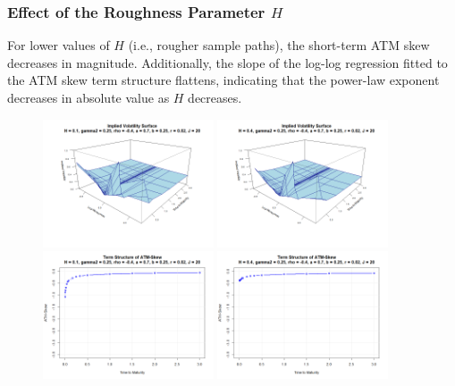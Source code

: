 \subsubsection*{Effect of the Roughness Parameter $H$}
For lower values of $H$ (i.e., rougher sample paths), the short-term ATM skew decreases in magnitude. Additionally, the slope of the log-log regression fitted to the ATM skew term structure flattens, indicating that the power-law exponent decreases in absolute value as $H$ decreases.
\begin{figure}[H]
    \centering
    \includegraphics[width=0.45\textwidth]{figures/5.2 Individual Parameter Effects/H=0.10_iv_surface.png}
	\includegraphics[width=0.45\textwidth]{figures/5.2 Individual Parameter Effects/H=0.40_iv_surface.png}
	\includegraphics[width=0.45\textwidth]{figures/5.2 Individual Parameter Effects/H=0.10_atm_skew.png}
	\includegraphics[width=0.45\textwidth]{figures/5.2 Individual Parameter Effects/H=0.40_atm_skew.png}

\end{figure}
